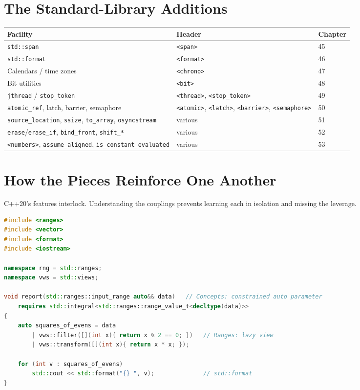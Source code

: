 \section{The Standard-Library Additions}
\label{sec:c20-lib-additions}

\begin{center}
\begin{tabular}{lll}
\hline
\textbf{Facility} & \textbf{Header} & \textbf{Chapter} \\
\hline
\texttt{std::span} & \texttt{<span>} & 45 \\
\texttt{std::format} & \texttt{<format>} & 46 \\
Calendars / time zones & \texttt{<chrono>} & 47 \\
Bit utilities & \texttt{<bit>} & 48 \\
\texttt{jthread} / \texttt{stop\_token} & \texttt{<thread>}, \texttt{<stop\_token>} & 49 \\
\texttt{atomic\_ref}, latch, barrier, semaphore & \texttt{<atomic>}, \texttt{<latch>}, \texttt{<barrier>}, \texttt{<semaphore>} & 50 \\
\texttt{source\_location}, \texttt{ssize}, \texttt{to\_array}, \texttt{osyncstream} & various & 51 \\
\texttt{erase}/\texttt{erase\_if}, \texttt{bind\_front}, \texttt{shift\_*} & various & 52 \\
\texttt{<numbers>}, \texttt{assume\_aligned}, \texttt{is\_constant\_evaluated} & various & 53 \\
\hline
\end{tabular}
\end{center}

\section{How the Pieces Reinforce One Another}
\label{sec:c20-reinforce}

C++20's features interlock. Understanding the couplings prevents learning each in isolation and missing the leverage.

\begin{lstlisting}[language=C++,caption={A single expression touching four C++20 subsystems}]
#include <ranges>
#include <vector>
#include <format>
#include <iostream>

namespace rng = std::ranges;
namespace vws = std::views;

void report(std::ranges::input_range auto&& data)   // Concepts: constrained auto parameter
    requires std::integral<std::ranges::range_value_t<decltype(data)>>
{
    auto squares_of_evens = data
        | vws::filter([](int x){ return x % 2 == 0; })   // Ranges: lazy view
        | vws::transform([](int x){ return x * x; });

    for (int v : squares_of_evens)
        std::cout << std::format("{} ", v);              // std::format
}
\end{lstlisting}

